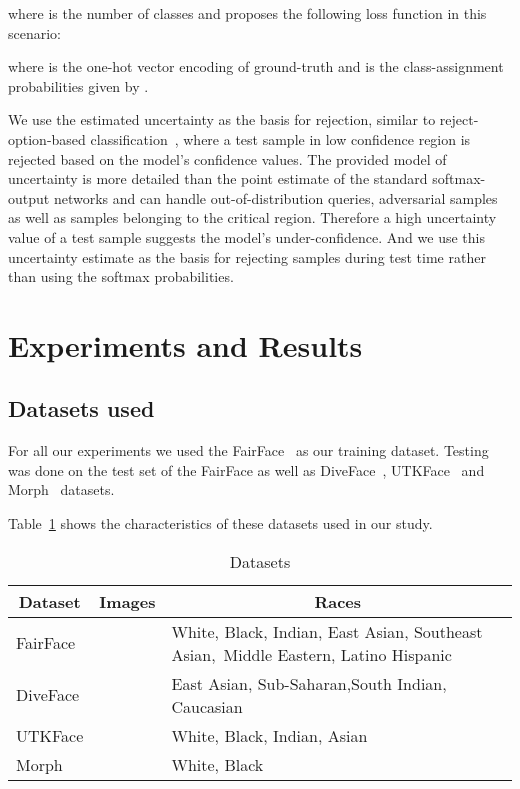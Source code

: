 \documentclass[runningheads]{llncs}
\begin{document}
where  is the number of classes and 
\cite{edl} proposes the following loss function in this scenario: 


where  is the one-hot vector encoding of ground-truth and  is the class-assignment probabilities given by .

We use the estimated uncertainty as the basis for rejection, similar to reject-option-based classification~\cite{reject_option}, where a test sample in low confidence region is rejected based on the model's confidence values. The provided model of uncertainty is more detailed than the point estimate of the standard softmax-output networks and can handle out-of-distribution queries, adversarial samples as well as samples belonging to the critical region. Therefore a high uncertainty value of a test sample suggests the model's under-confidence. And we use this uncertainty estimate as the basis for rejecting samples during test time rather than using the softmax probabilities.

\section{Experiments and Results}
\subsection{Datasets used}
For all our experiments we used the FairFace~\cite{fairface} as our training dataset. Testing was done on the test set of the FairFace as well as DiveFace~\cite{diveface}, UTKFace~\cite{utkface} and Morph~\cite{morph} datasets.

Table~\ref{tab:datasets} shows the characteristics of these datasets used in our study.

\begin{table}[!ht]
    \centering
    \caption{Datasets}
    \label{tab:datasets}
    \begin{tabular}{llp{8cm}}
    \toprule
    \multicolumn{1}{c}{\textbf{Dataset}} & \multicolumn{1}{c}{\textbf{Images}} & \multicolumn{1}{c}{\textbf{Races}} \\ \midrule
    FairFace &  & White, Black, Indian, East Asian, Southeast Asian,~Middle Eastern, Latino Hispanic \\
    DiveFace &  & East Asian, Sub-Saharan,South Indian, Caucasian \\
    UTKFace &  & White, Black, Indian, Asian \\
    Morph &  & White, Black\\
    \bottomrule
    \end{tabular}
\end{table}
\end{document}
